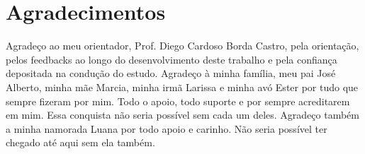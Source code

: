 \chapter*{Agradecimentos}

Agradeço ao meu orientador, Prof. Diego Cardoso Borda Castro, pela orientação, pelos feedbacks ao longo do desenvolvimento deste trabalho e pela confiança depositada na condução do estudo. Agradeço à minha família, meu pai José Alberto, minha mãe Marcia, minha irmã Larissa e minha avó Ester por tudo que sempre fizeram por mim. Todo o apoio, todo suporte e por sempre acreditarem em mim. Essa conquista não seria possível sem cada um deles. Agradeço também a minha namorada Luana por todo apoio e carinho. Não seria possível ter chegado até aqui sem ela também.
